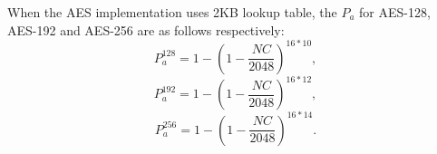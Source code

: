 
When the AES implementation uses 2KB lookup table, the $P_{a}$ for AES-128, AES-192 and AES-256 are as follows respectively:
\begin{equation*}
    P_{a}^{128} = 1- (1-\frac{NC}{2048})^{16*10},
\end{equation*}
\begin{equation*}
    P_{a}^{192} = 1- (1-\frac{NC}{2048})^{16*12},
\end{equation*}
\begin{equation*}
    P_{a}^{256} = 1- (1-\frac{NC}{2048})^{16*14}.
\end{equation*}
